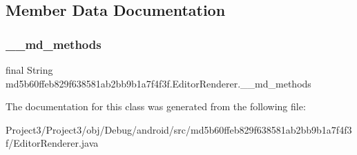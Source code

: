 \subsection{Member Data Documentation}
\mbox{\label{classmd5b60ffeb829f638581ab2bb9b1a7f4f3f_1_1EditorRenderer_a05a5e2737d5175d2d79f153c42ba484d}} 
\subsubsection{\texorpdfstring{\+\_\+\+\_\+md\+\_\+methods}{\_\_md\_methods}}
{\footnotesize\ttfamily final String md5b60ffeb829f638581ab2bb9b1a7f4f3f.\+Editor\+Renderer.\+\_\+\+\_\+md\+\_\+methods\hspace{0.3cm}{\ttfamily [static]}}



The documentation for this class was generated from the following file\+:\begin{DoxyCompactItemize}
\item 
Project3/\+Project3/obj/\+Debug/android/src/md5b60ffeb829f638581ab2bb9b1a7f4f3f/Editor\+Renderer.\+java\end{DoxyCompactItemize}
